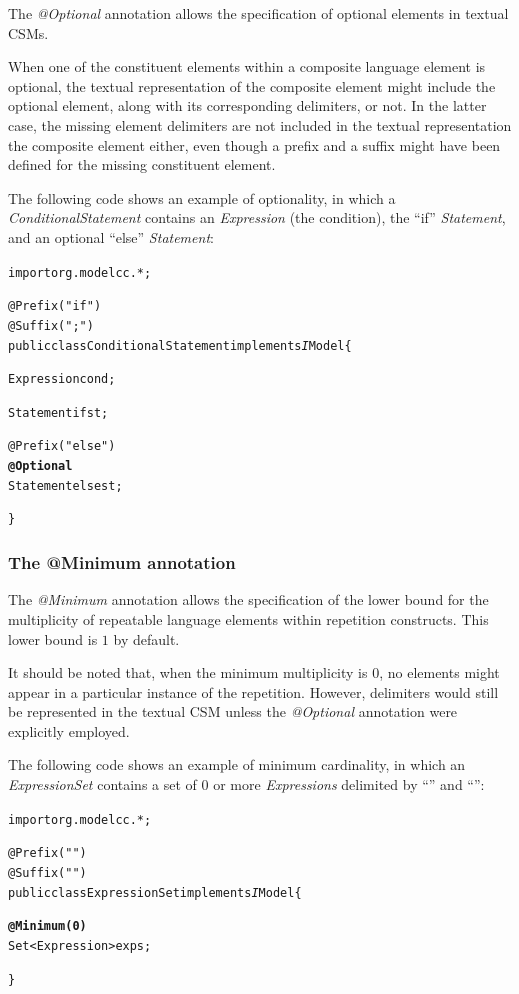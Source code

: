 \documentclass[a4paper,twoside,onecolumn]{article}
\newenvironment{colframe}{%
  \begin{Sbox} 
    \begin{minipage}{.8\columnwidth} 
}{%

  \end{minipage} 
  \end{Sbox} 
  \begin{center} 
    \fcolorbox{black}{MyGray}{\TheSbox} 
  \end{center} 
}
\newcommand{\an}[1]{\emph{#1}} %
\begin{document}
The \an{@Optional} annotation allows the specification of optional elements in textual CSMs.

When one of the constituent elements within a composite language element is optional, the textual representation of the composite element might
include the optional element, along with its corresponding delimiters, or not. In the latter case, the missing element delimiters are not
included in the textual representation the composite element either, even though a prefix and a suffix might have been defined for the missing
constituent element.

The following code shows an example of optionality, in which a \emph{ConditionalStatement} contains an \emph{Expression} (the condition), the ``if'' \emph{Statement}, and an optional ``else'' \emph{Statement}:

\begin{colframe}
\begin{alltt}
import org.modelcc.*;

@Prefix("if")
@Suffix(";")
public class ConditionalStatement implements{\emph IModel} \{

  Expression cond;

  Statement ifst;

  @Prefix("else")
  {\bf @Optional}
  Statement elsest;

\}
\end{alltt}
\end{colframe}

\subsubsection{The @Minimum annotation}

The \an{@Minimum} annotation allows the specification of the lower bound for the multiplicity of repeatable language elements within repetition constructs. This lower bound is $1$ by default.

It should be noted that, when the minimum multiplicity is $0$, no elements might appear in a particular instance of the repetition. However,
delimiters would still be represented in the textual CSM unless the \an{@Optional} annotation were explicitly employed.

The following code shows an example of minimum cardinality, in which an \emph{ExpressionSet} contains a set of $0$ or more \emph{Expressions} delimited by ``{'' and ``}'':

\begin{colframe}
\begin{alltt}
import org.modelcc.*;

@Prefix("{")
@Suffix("}")
public class ExpressionSet implements{\emph IModel} \{
  
  {\bf @Minimum(0)}
  Set<Expression> exps;

\}
\end{alltt}
\end{colframe}
\end{document}
